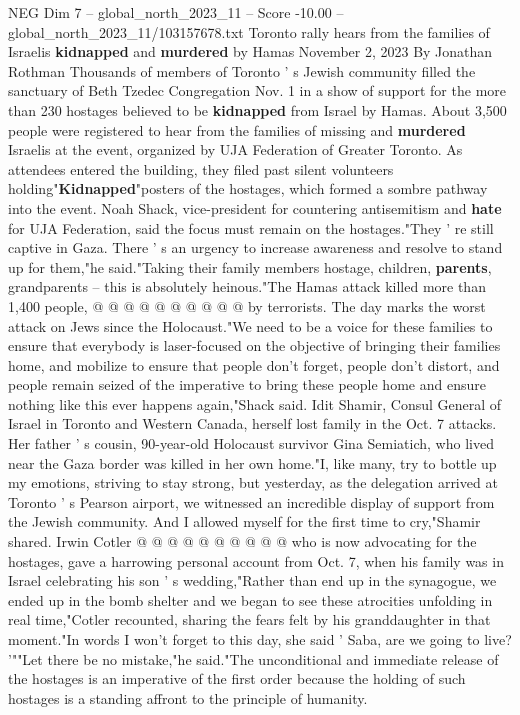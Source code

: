 \begin{textsample}{NEG Dim 7 – global\_north\_2023\_11 – Score -10.00 – global\_north\_2023\_11/103157678.txt}  \label{ex:f7_neg_047}
Toronto rally hears from the families of Israelis \textbf{kidnapped} and \textbf{murdered} by Hamas November 2, 2023 By Jonathan Rothman Thousands of members of Toronto ' s Jewish community filled the sanctuary of Beth Tzedec Congregation Nov. 1 in a show of support for the more than 230 hostages believed to be \textbf{kidnapped} from Israel by Hamas.
About 3,500 people were registered to hear from the families of missing and \textbf{murdered} Israelis at the event, organized by UJA Federation of Greater Toronto.
As attendees entered the building, they filed past silent volunteers holding"\textbf{Kidnapped}"posters of the hostages, which formed a sombre pathway into the event.
Noah Shack, vice-president for countering antisemitism and \textbf{hate} for UJA Federation, said the focus must remain on the hostages."They ' re still captive in Gaza.
There ' s an urgency to increase awareness and resolve to stand up for them,"he said."Taking their family members hostage, children, \textbf{parents}, grandparents -- this is absolutely heinous."The Hamas attack killed more than 1,400 people, @ @ @ @ @ @ @ @ @ @ by terrorists.
The day marks the worst attack on Jews since the Holocaust."We need to be a voice for these families to ensure that everybody is laser-focused on the objective of bringing their families home, and mobilize to ensure that people don't forget, people don't distort, and people remain seized of the imperative to bring these people home and ensure nothing like this ever happens again,"Shack said.
Idit Shamir, Consul General of Israel in Toronto and Western Canada, herself lost family in the Oct. 7 attacks.
Her father ' s cousin, 90-year-old Holocaust survivor Gina Semiatich, who lived near the Gaza border was killed in her own home."I, like many, try to bottle up my emotions, striving to stay strong, but yesterday, as the delegation arrived at Toronto ' s Pearson airport, we witnessed an incredible display of support from the Jewish community.
And I allowed myself for the first time to cry,"Shamir shared.
Irwin Cotler @ @ @ @ @ @ @ @ @ @ who is now advocating for the hostages, gave a harrowing personal account from Oct. 7, when his family was in Israel celebrating his son ' s wedding,"Rather than end up in the synagogue, we ended up in the bomb shelter and we began to see these atrocities unfolding in real time,"Cotler recounted, sharing the fears felt by his granddaughter in that moment."In words I won't forget to this day, she said ' Saba, are we going to live? '""Let there be no mistake,"he said."The unconditional and immediate release of the hostages is an imperative of the first order because the holding of such hostages is a standing affront to the principle of humanity.

\end{textsample}
